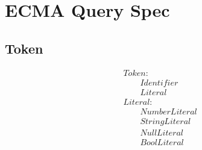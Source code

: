 \documentclass[12pt, a4papaer, AutoFakeBold, AutoFakeSlant]{article}
\begin{document}
\justifying
\section*{ECMA Query Spec}
\subsection*{Token}
\begin{align*}
& Token: \\
& \quad\quad Identifier \\
& \quad\quad Literal \\
& Literal: \\
& \quad\quad NumberLiteral \\
& \quad\quad StringLiteral \\
& \quad\quad NullLiteral \\
& \quad\quad BoolLiteral \\
\end{align*}
\end{document}
